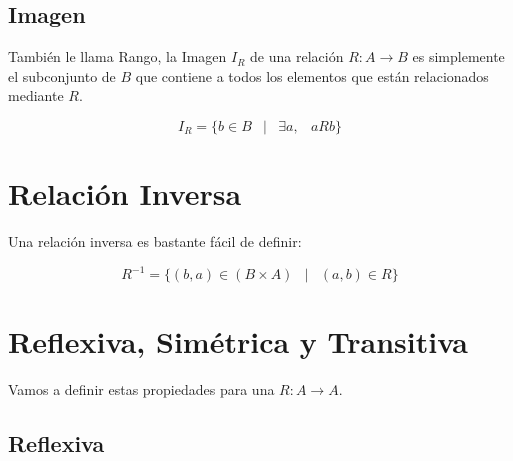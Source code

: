 \documentclass[12pt]{report}                                    %
\DeclareMathOperator \Space {\quad}                             %
\DeclareMathOperator \MiniSpace {\;}                            %
\newcommand \Such {\MiniSpace|\MiniSpace}                       %
\begin{document}
            \subsection*{Imagen}

                También le llama Rango, la Imagen $I_R$ de una relación $R : A \to B$
                es simplemente el subconjunto de $B$ que contiene a todos los elementos que están
                relacionados mediante $R$.

                \begin{equation}
                    I_R = \{ b \in B \Such \exists a, \MiniSpace aRb \}
                \end{equation}




        \clearpage
        \section{Relación Inversa}

            Una relación inversa es bastante fácil de definir:

            \begin{equation}
                R^{-1} = \{ (b, a) \in (B \times A) \Such (a, b) \in R \}
            \end{equation}





        \clearpage
        \section{Reflexiva, Simétrica y Transitiva}

            Vamos a definir estas propiedades para una $R: A \to A$.
                
            \subsection{Reflexiva}
\end{document}
